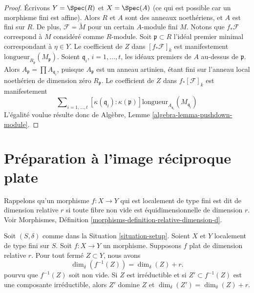 \begin{proof}
\medskip\noindent
Écrivons $Y = \Spec(R)$ et $X = \Spec(A)$ (ce qui est possible car
un morphisme fini est affine).
Alors $R$ et $A$ sont des anneaux noethériens, et $A$ est fini sur $R$.
De plus, $\mathcal{F} = \widetilde{M}$ pour un certain $A$-module fini
$M$. Notons que $f_*\mathcal{F}$ correspond à $M$ considéré comme $R$-module.
Soit $\mathfrak p \subset R$ l'idéal premier minimal correspondant
à $\eta \in Y$. Le coefficient de $Z$ dans $[f_*\mathcal{F}]_k$
est manifestement $\text{longueur}_{R_{\mathfrak p}}(M_{\mathfrak p})$.
Soient $\mathfrak q_i$, $i = 1, \ldots, t$, les idéaux premiers de $A$
au-dessus de $\mathfrak p$. Alors $A_{\mathfrak p} = \prod A_{\mathfrak q_i}$,
puisque $A_{\mathfrak p}$ est un anneau artinien, étant fini sur l'anneau
local noethérien de dimension zéro $R_{\mathfrak p}$.
Le coefficient de $Z$ dans $f_*[\mathcal{F}]_k$ est manifestement
$$
\sum\nolimits_{i = 1, \ldots, t}
[\kappa(\mathfrak q_i) : \kappa(\mathfrak p)]
\text{longueur}_{A_{\mathfrak q_i}}(M_{\mathfrak q_i})
$$
L'égalité voulue résulte donc de
Algèbre, Lemme \ref{algebra-lemma-pushdown-module}.
\end{proof}




















\section{Préparation à l'image réciproque plate}
\label{section-preparation-flat-pullback}


\noindent
Rappelons qu'un morphisme $f : X \to Y$ qui est localement de type fini
est dit de dimension relative $r$ si toute fibre non vide
est équidimensionnelle de dimension $r$. Voir
Morphismes, Définition \ref{morphisms-definition-relative-dimension-d}.

\begin{lemma}
\label{lemma-flat-inverse-image-dimension}
Soit $(S, \delta)$ comme dans la Situation \ref{situation-setup}.
Soient $X$ et $Y$ localement de type fini sur $S$.
Soit $f : X \to Y$ un morphisme.
Supposons $f$ plat de dimension relative $r$.
Pour tout fermé $Z \subset Y$, nous avons
$$
\dim_\delta(f^{-1}(Z)) = \dim_\delta(Z) + r.
$$
pourvu que $f^{-1}(Z)$ soit non vide.
Si $Z$ est irréductible et si $Z' \subset f^{-1}(Z)$ est une composante irréductible,
alors $Z'$ domine $Z$ et
$\dim_\delta(Z') = \dim_\delta(Z) + r$.
\end{lemma}

